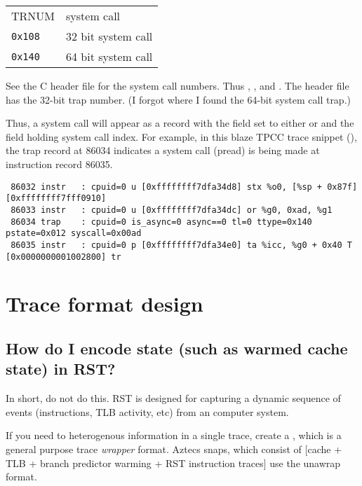 \documentclass[10pt]{article}
\begin{document}
\begin{tabular}{|l|l|}
  TRNUM & system call \\
  \texttt{0x108} & 32 bit system call \\
  \texttt{0x140} & 64 bit system call \\
\end{tabular}

See the C header file  for the system
call numbers.  Thus , , and
.  The header file 
has the 32-bit trap number.  (I forgot where I found the 64-bit system
call trap.)

Thus, a system call will appear as a  record with the
 field set to either  or  and
the  field holding system call index.  For example, in
this blaze TPCC trace snippet (), the trap record at 86034
indicates a system call (pread) is being made at instruction record
86035.

\begin{verbatim}
 86032 instr   : cpuid=0 u [0xffffffff7dfa34d8] stx %o0, [%sp + 0x87f]  [0xffffffff7fff0910] 
 86033 instr   : cpuid=0 u [0xffffffff7dfa34dc] or %g0, 0xad, %g1          
 86034 trap    : cpuid=0 is_async=0 async==0 tl=0 ttype=0x140 pstate=0x012 syscall=0x00ad 
 86035 instr   : cpuid=0 p [0xffffffff7dfa34e0] ta %icc, %g0 + 0x40 T [0x0000000001002800] tr 
\end{verbatim}

\section{Trace format design}

\subsection{How do I encode state (such as warmed cache state) in RST?}

In short, do not do this.  RST is designed for capturing a dynamic
sequence of events (instructions, TLB activity, etc) from an computer
system.

If you need to heterogenous information in a single trace, create a
, which
is a general purpose trace \textsl{wrapper} format.  Aztecs snaps, which
consist of [cache + TLB + branch predictor warming + RST instruction
traces] use the unawrap format.
\end{document}
